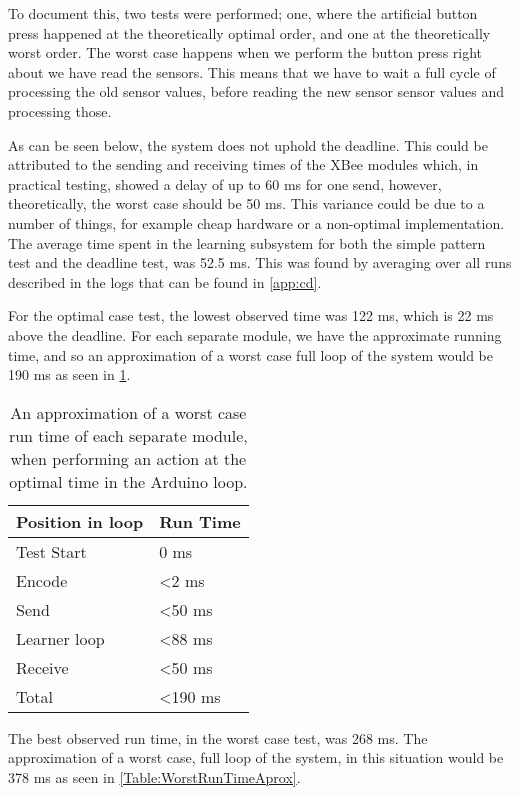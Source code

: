 To document this, two tests were performed; one, where the artificial button press happened at the theoretically optimal order, and one at the theoretically worst order. The worst case happens when we perform the button press right about we have read the sensors. This means that we have to wait a full cycle of processing the old sensor values, before reading the new sensor sensor values and processing those.

As can be seen below, the system does not uphold the deadline. This could be attributed to the sending and receiving times of the XBee modules which, in practical testing, showed a delay of up to 60 ms for one send, however, theoretically, the worst case should be 50 ms\cite{xbee_latency}. This variance could be due to a number of things, for example cheap hardware or a non-optimal implementation. The average time spent in the learning subsystem for both the simple pattern test and the deadline test, was 52.5 ms. This was found by averaging over all runs described in the logs that can be found in \cref{app:cd}.

For the optimal case test, the lowest observed time was 122 ms, which is 22 ms above the deadline. For each separate module, we have the approximate running time, and so an approximation of a worst case full loop of the system would be 190 ms as seen in \cref{Table:RunTimeAprox}.

\begin{table}[htbp]
  \centering
  \begin{tabular}{l l}
	\toprule
	Position in loop		& Run Time  \\ \midrule
	Test Start		        & 0 ms         \\ \midrule
	Encode 			        & <2 ms  	\\ \midrule
	Send   			        & <50 ms     \\ \midrule
	Learner loop 	        & <88 ms     \\ \midrule
	Receive 		        & <50 ms     \\ \midrule \midrule
	Total			        & <190 ms	    \\
                                          \bottomrule
  \end{tabular}
  \caption{An approximation of a worst case run time of each separate module, when performing an action at the optimal time in the Arduino loop.}\label{Table:RunTimeAprox}
\end{table}

The best observed run time, in the worst case test, was 268 ms. The approximation of a worst case, full loop of the system, in this situation would be 378 ms as seen in \cref{Table:WorstRunTimeAprox}.

